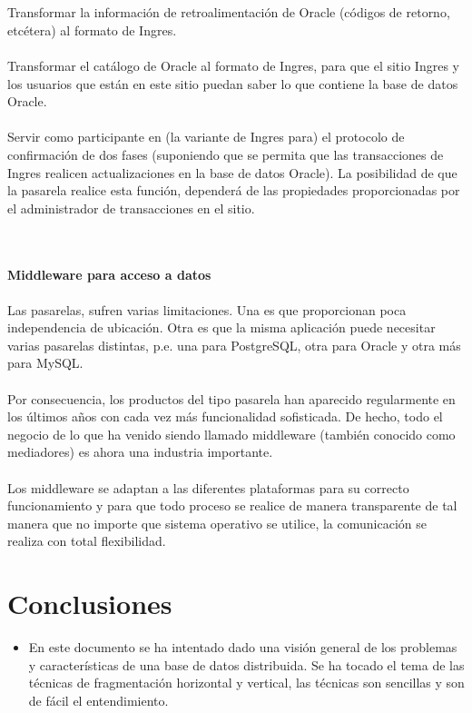 \documentclass[10pt,a4paper,oneside]{article}
\begin{document}
\begin {itemize}
\\\\Transformar la informaci\'on de retroalimentaci\'on de Oracle (c\'odigos de retorno, etc\'etera) al formato de Ingres.
\\\\Transformar el cat\'alogo de Oracle al formato de Ingres, para que el sitio Ingres y los usuarios que est\'an en este sitio puedan saber lo que contiene la base de datos Oracle.
\\\\Servir como participante en (la variante de Ingres para) el protocolo de confirmaci\'on de dos fases (suponiendo que se permita que las transacciones de Ingres realicen actualizaciones en la base de datos Oracle). La posibilidad de que la pasarela realice esta funci\'on, depender\'a de las propiedades proporcionadas por el administrador de transacciones en el sitio.

\\\\ {\bf Middleware para acceso a datos}
\\\\Las pasarelas, sufren varias limitaciones. Una es que proporcionan poca independencia de ubicaci\'on. Otra es que la misma aplicaci\'on puede necesitar varias pasarelas distintas, p.e. una para PostgreSQL, otra para Oracle y otra m\'as para MySQL. 
\\\\Por consecuencia, los productos del tipo pasarela han aparecido regularmente en los \'ultimos a\~nos con cada vez m\'as funcionalidad sofisticada. De hecho, todo el negocio de lo que ha venido siendo llamado middleware (tambi\'en conocido como mediadores) es ahora una industria importante. 
\\\\Los middleware se adaptan a las diferentes plataformas para su correcto funcionamiento y para que todo proceso se realice de manera transparente de tal manera que no importe que sistema operativo se utilice, la comunicaci\'on se realiza con total flexibilidad. 


\section{Conclusiones}
\begin {itemize}
\item En este documento se ha intentado dado una visi\'on general de los problemas y caracter\'isticas de una base de datos distribuida. Se ha tocado el tema de las t\'ecnicas de fragmentaci\'on horizontal y vertical, las t\'ecnicas son sencillas y son de f\'acil el entendimiento.


\end{itemize}
\end{itemize}
\end{document}
